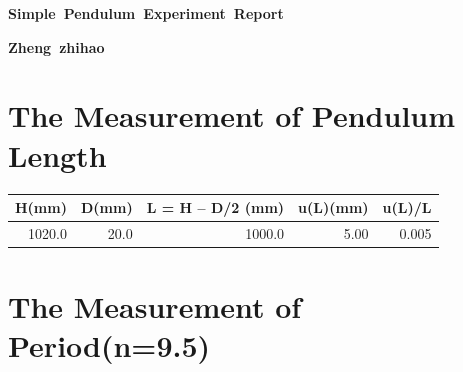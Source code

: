 \documentclass{report}
\begin{document}
\vspace{-10cm}

\begin{center}
    \huge \bfseries \mbox {Simple Pendulum Experiment Report}
\end{center}

\begin{center}
    \large \bfseries \mbox {Zheng zhihao}
\end{center}

\section*{\centering The Measurement of Pendulum Length}

\begin{table}[H]
\centering
\begin{tabular}{|l|l|l|l|l|}
\hline
H(mm)                        & D(mm)                     & L = H – D/2  (mm)           & u(L)(mm)                  & u(L)/L                     \\ \hline
\multicolumn{1}{|r|}{1020.0} & \multicolumn{1}{r|}{20.0} & \multicolumn{1}{r|}{1000.0} & \multicolumn{1}{r|}{5.00} & \multicolumn{1}{r|}{0.005} \\ \hline
\end{tabular}
\end{table}

\section*{\centering The Measurement of Period(n=9.5)}
\end{document}
